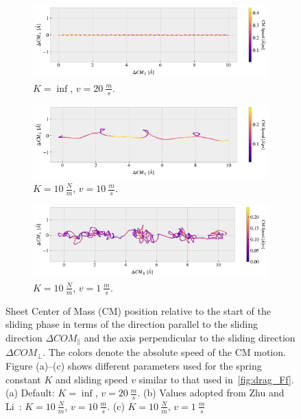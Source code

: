 \begin{figure}[!htb]
  \centering
  \begin{subfigure}[t]{0.85\textwidth}
    \centering
    \includegraphics[width=\textwidth]{figures/baseline/COM_path_K0.pdf}
    \caption{$K = \inf$, $v = \SI{20}{\frac{m}{s}}$.}
    \label{fig:CM_path_def}
  \end{subfigure}
  \hfill
  \begin{subfigure}[t]{0.85\textwidth}
    \centering
    \includegraphics[width=\textwidth]{figures/baseline/COM_path_K10_v10.pdf}
    \caption{$K = \SI{10}{\frac{N}{m}}$, $v = \SI{10}{\frac{m}{s}}$.}
    \label{fig:CM_path_K10_v10}
  \end{subfigure}
  \begin{subfigure}[t]{0.85\textwidth}
    \centering
    \includegraphics[width=\textwidth]{figures/baseline/COM_path_K10_v1.pdf}
    \caption{$K = \SI{10}{\frac{N}{m}}$, $v = \SI{1}{\frac{m}{s}}$.}
    \label{fig:CM_path_K10_v1}
  \end{subfigure}
  \caption{Sheet Center of Mass (\acrshort{CM}) position relative to the start of the sliding phase in terms of the direction parallel to the sliding direction $\Delta COM_{\parallel}$ and the axis perpendicular to the sliding direction $\Delta COM_{\perp}$. The colors denote the absolute speed of the \acrshort{CM} motion. Figure (a)--(c) shows different parameters used for the spring constant $K$ and sliding speed $v$ similar to that used in~\cref{fig:drag_Ff}. (a) Default: $K = \inf$, $v = \SI{20}{\frac{m}{s}}$. (b) Values adopted from Zhu
  and Li~\cite{zhu_study_2018}: $K = \SI{10}{\frac{N}{m}}$, $v = \SI{10}{\frac{m}{s}}$. (c) $K = \SI{10}{\frac{N}{m}}$, $v = \SI{1}{\frac{m}{s}}$ }
  \label{fig:CM_path}
\end{figure}



